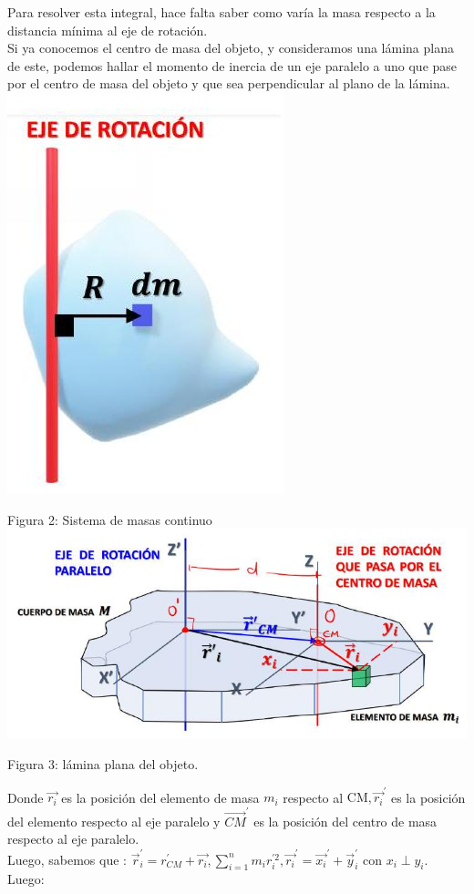 \documentclass[10pt]{article}
\begin{document}
Para resolver esta integral, hace falta saber como varía la masa respecto a la distancia mínima al eje de rotación.\\
Si ya conocemos el centro de masa del objeto, y consideramos una lámina plana de este, podemos hallar el momento de inercia de un eje paralelo a uno que pase por el centro de masa del objeto y que sea perpendicular al plano de la lámina.\\
\includegraphics[scale = 0.15, center]{2025_04_01_ea720b93e8ebb5d0c6aeg-05}

Figura 2: Sistema de masas continuo\\
\includegraphics[scale = 0.15, center]{2025_04_01_ea720b93e8ebb5d0c6aeg-05(1)}

Figura 3: lámina plana del objeto.

Donde $\overrightarrow{r_{i}}$ es la posición del elemento de masa $m_{i}$ respecto al $\mathrm{CM},{\overrightarrow{r_{i}}}^{\prime}$ es la posición del elemento respecto al eje paralelo y $\overrightarrow{C M}^{\prime}$ es la posición del centro de masa respecto al eje paralelo.\\
Luego, sabemos que : $\vec{r}_{i}^{\prime}=r_{C M}^{\prime}+\overrightarrow{r_{i}}, \sum_{i=1}^{n} m_{i} r_{i}^{\prime 2},{\overrightarrow{r_{i}}}^{\prime}={\overrightarrow{x_{i}}}^{\prime}+\vec{y}_{i}^{\prime}$ con $x_{i} \perp y_{i}$. Luego:
\end{document}
